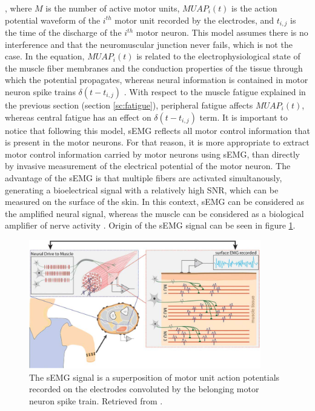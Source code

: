 , where $M$ is the number of active motor units, $MUAP_i(t)$ is the action potential waveform of the $i^{th}$ motor unit recorded by the electrodes, and $t_{i,j}$ is the time of the discharge of the $i^{th}$ motor neuron. This model assumes there is no interference and that the neuromuscular junction never fails, which is not the case. In the equation, $MUAP_i(t)$ is related to the electrophysiological state of the muscle fiber membranes and the conduction properties of the tissue through which the potential propagates, whereas neural information is contained in motor neuron spike trains $\delta(t-t_{i,j})$ \citep{Farina2014b}. With respect to the muscle fatigue explained in the previous section (section \ref{sc:fatigue}), peripheral fatigue affects $MUAP_i(t)$, whereas central fatigue has an effect on $\delta(t-t_{i,j})$ term. It is important to notice that following this model, sEMG reflects all motor control information that is present in the motor neurons. For that reason, it is more appropriate to extract motor control information carried by motor neurons using sEMG, than directly by invasive measurement of the electrical potential of the motor neuron. The advantage of the sEMG is that multiple fibers are activated simultanously, generating a bioelectrical signal with a relatively high SNR, which can be measured on the surface of the skin. In this context, sEMG can be considered as the amplified neural signal, whereas the muscle can be considered as a biological amplifier of nerve activity \citep{Farina2014}. Origin of the sEMG signal can be seen in figure \ref{fig:EMG_origin}.
\begin{figure}[ht]
\centering
\includegraphics[width=0.90\textwidth]{Images/introduction/EMG_origin.png}
\caption{The sEMG signal is a superposition of motor unit action potentials recorded on the electrodes convoluted by the belonging motor neuron spike train. Retrieved from \citet{Farina2014}.}
\label{fig:EMG_origin}
\end{figure}

